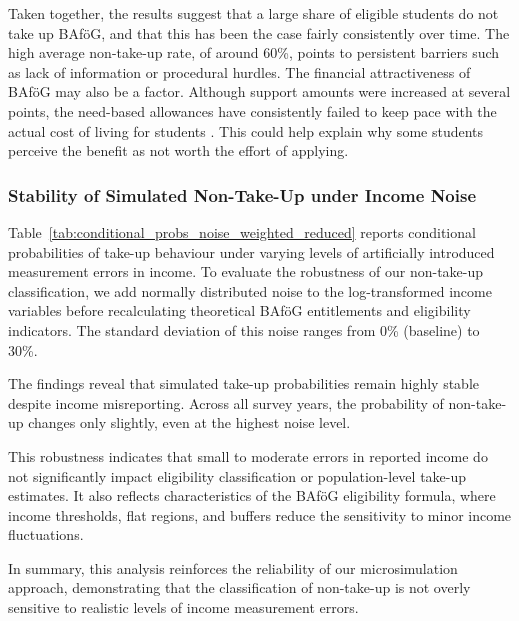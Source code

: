 Taken together, the results suggest that a large share of eligible students do not take up BAföG, and that this has been the case fairly consistently over time. 
The high average non-take-up rate, of around 60\%, points to persistent barriers such as lack of information or procedural hurdles. 
The financial attractiveness of BAföG may also be a factor. 
Although support amounts were increased at several points, the need-based allowances have consistently failed to keep pace with the actual cost of living for students \citep{staack_von_2017}. 
This could help explain why some students perceive the benefit as not worth the effort of applying. 


\subsubsection{Stability of Simulated Non-Take-Up under Income Noise}
Table~\ref{tab:conditional_probs_noise_weighted_reduced} reports conditional probabilities of take-up behaviour under varying levels of artificially introduced measurement errors in income. 
To evaluate the robustness of our non-take-up classification, we add normally distributed noise to the log-transformed income variables before recalculating theoretical BAföG entitlements and eligibility indicators. 
The standard deviation of this noise ranges from 0\% (baseline) to 30\%.



The findings reveal that simulated take-up probabilities remain highly stable despite income misreporting. 
Across all survey years, the probability of non-take-up changes only slightly, even at the highest noise level. 

This robustness indicates that small to moderate errors in reported income do not significantly impact eligibility classification or population-level take-up estimates. 
It also reflects characteristics of the BAföG eligibility formula, where income thresholds, flat regions, and buffers reduce the sensitivity to minor income fluctuations.

In summary, this analysis reinforces the reliability of our microsimulation approach, demonstrating that the classification of non-take-up is not overly sensitive to realistic levels of income measurement errors.



